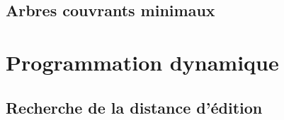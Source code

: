 \documentclass[12pt, a4paper]{report}
\begin{document}


    \section{Arbres couvrants minimaux}


\chapter{Programmation dynamique}
    \section{Recherche de la distance d'édition}
\end{document}
